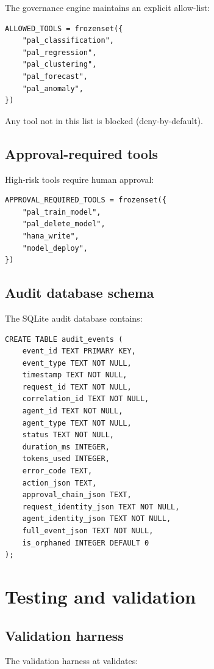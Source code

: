 The governance engine maintains an explicit allow-list:

\begin{verbatim}
ALLOWED_TOOLS = frozenset({
    "pal_classification",
    "pal_regression",
    "pal_clustering",
    "pal_forecast",
    "pal_anomaly",
})
\end{verbatim}

Any tool not in this list is blocked (deny-by-default).

\subsection{Approval-required tools}

High-risk tools require human approval:

\begin{verbatim}
APPROVAL_REQUIRED_TOOLS = frozenset({
    "pal_train_model",
    "pal_delete_model",
    "hana_write",
    "model_deploy",
})
\end{verbatim}

\subsection{Audit database schema}

The SQLite audit database contains:

\begin{verbatim}
CREATE TABLE audit_events (
    event_id TEXT PRIMARY KEY,
    event_type TEXT NOT NULL,
    timestamp TEXT NOT NULL,
    request_id TEXT NOT NULL,
    correlation_id TEXT NOT NULL,
    agent_id TEXT NOT NULL,
    agent_type TEXT NOT NULL,
    status TEXT NOT NULL,
    duration_ms INTEGER,
    tokens_used INTEGER,
    error_code TEXT,
    action_json TEXT,
    approval_chain_json TEXT,
    request_identity_json TEXT NOT NULL,
    agent_identity_json TEXT NOT NULL,
    full_event_json TEXT NOT NULL,
    is_orphaned INTEGER DEFAULT 0
);
\end{verbatim}

\section{Testing and validation}

\subsection{Validation harness}

The validation harness at
validates:

